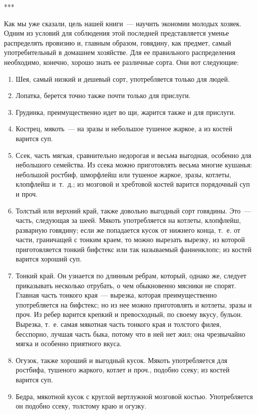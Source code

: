 ***

Как мы уже сказали, цель нашей книги~--- научить экономии молодых хозяек. Одним из условий для соблюдения этой последней представляется уменье распределять провизию и, главным образом, говядину, как предмет, самый употребительный в домашнем хозяйстве. Для ее правильного распределения необходимо, конечно, хорошо знать ее различные сорта. Они вот следующие:

\begin{enumerate}
	\item Шея, самый низкий и дешевый сорт, употребляется только для людей.
	\item Лопатка, берется точно также почти только для прислуги.
	\item Грудинка, преимущественно идет во щи, жарится также и для прислуги.
	\item Кострец, мякоть~--- на зразы и небольшое тушеное жаркое, а из костей варится суп.
	\item Ссек, часть мягкая, сравнительно недорогая и весьма выгодная, особенно для небольшого семейства. Из ссека можно приготовлять весьма многие кушанья: небольшой ростбиф, шморфлейш или тушеное жаркое, зразы, котлеты, клопфлейш и~т.~д.; из мозговой и хребтовой костей варится порядочный суп и проч.
	\item Толстый или верхний край, также довольно выгодный сорт говядины. Это~--- часть, следующая за шеей. Мякоть употребляется на котлеты, клопфлейш, разварную говядину; если же попадается кусок от нижнего конца, т.~е. от части, граничащей с тонким краем, то можно вырезать вырезку, из которой приготовляется тонкий бифстекс или так называемый фанненклопс; из костей варится хороший суп.
	\item Тонкий край. Он узнается по длинным ребрам, который, однако же, следует приказывать несколько отрубать, о чем обыкновенно мясники не спорят. Главная часть тонкого края~--- вырезка, которая преимущественно употребляется на бифстекс; но из нее можно приготовлять и котлеты, зразы и проч. Из ребер варится крепкий и превосходный, по своему вкусу, бульон. Вырезка, т.~е. самая мякотная часть тонкого края и толстого филея, бесспорно, лучшая часть быка, потому что в ней нет жил; она чрезвычайно мягка и особенно приятного вкуса.
	\item Огузок, также хороший и выгодный кусок. Мякоть употребляется для ростбифа, тушеного жаркого, котлет и проч., подобно ссеку; из костей варится суп.
	\item Бедра, мякотной кусок с круглой вертлужной мозговой костью. Употребляется он подобно ссеку, толстому краю и огузку.

\end{enumerate}
